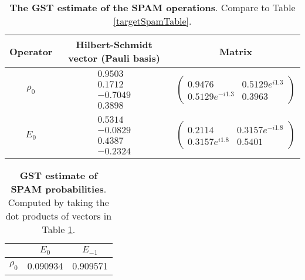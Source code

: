 {\begin{table}[h]
\begin{center}
\begin{tabular}[l]{|c|c|c|}
\hline
Operator & Hilbert-Schmidt vector (Pauli basis) & Matrix \\ \hline
$\rho_{0}$ & $ \begin{array}{c}
0.9503 \\ 
0.1712 \\ 
-0.7049 \\ 
0.3898
 \end{array} $
 & $ \left(\!\!\begin{array}{cc}
0.9476 & 0.5129e^{i1.3} \\ 
0.5129e^{-i1.3} & 0.3963
 \end{array}\!\!\right) $
 \\ \hline
$E_{0}$ & $ \begin{array}{c}
0.5314 \\ 
-0.0829 \\ 
0.4387 \\ 
-0.2324
 \end{array} $
 & $ \left(\!\!\begin{array}{cc}
0.2114 & 0.3157e^{-i1.8} \\ 
0.3157e^{i1.8} & 0.5401
 \end{array}\!\!\right) $
 \\ \hline
\end{tabular}

\caption{\textbf{The GST estimate of the SPAM operations}.  Compare to Table \ref{targetSpamTable}.\label{bestCPTPGatesetSpamTable}}
\end{center}
\end{table}

\begin{table}[h]
\begin{center}
\begin{tabular}[l]{|c|c|c|}
\hline
 & $E_{0}$ & $E_{-1}$ \\ \hline
$\rho_{0}$ & 0.090934 & 0.909571 \\ \hline
\end{tabular}

\caption{\textbf{GST estimate of SPAM probabilities}.  Computed by taking the dot products of vectors in Table \ref{bestCPTPGatesetSpamTable}.\label{bestCPTPGatesetSpamParametersTable}}
\end{center}
\end{table}

}
